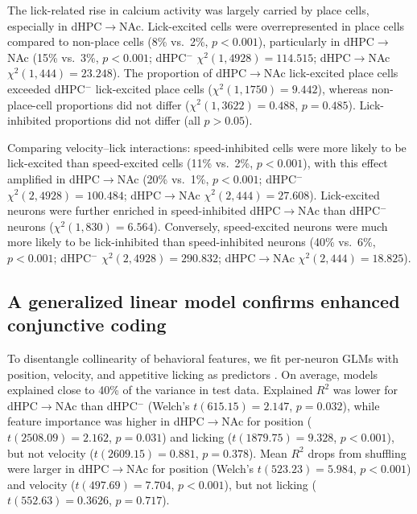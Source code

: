 \documentclass[10pt,a4paper]{article}
\begin{document}
The lick-related rise in calcium activity was largely carried by place cells, especially in dHPC$\rightarrow$NAc. Lick-excited cells were overrepresented in place cells compared to non-place cells (8\% vs.\ 2\%, $p<0.001$), particularly in dHPC$\rightarrow$NAc (15\% vs.\ 3\%, $p<0.001$; dHPC$^{-}$ $\chi^2(1,4928)=114.515$; dHPC$\rightarrow$NAc $\chi^2(1,444)=23.248$). The proportion of dHPC$\rightarrow$NAc lick-excited place cells exceeded dHPC$^{-}$ lick-excited place cells ($\chi^2(1,1750)=9.442$), whereas non-place-cell proportions did not differ ($\chi^2(1,3622)=0.488$, $p=0.485$). Lick-inhibited proportions did not differ (all $p>0.05$).

Comparing velocity--lick interactions: speed-inhibited cells were more likely to be lick-excited than speed-excited cells (11\% vs.\ 2\%, $p<0.001$), with this effect amplified in dHPC$\rightarrow$NAc (20\% vs.\ 1\%, $p<0.001$; dHPC$^{-}$ $\chi^2(2,4928)=100.484$; dHPC$\rightarrow$NAc $\chi^2(2,444)=27.608$). Lick-excited neurons were further enriched in speed-inhibited dHPC$\rightarrow$NAc than dHPC$^{-}$ neurons ($\chi^2(1,830)=6.564$). Conversely, speed-excited neurons were much more likely to be lick-inhibited than speed-inhibited neurons (40\% vs.\ 6\%, $p<0.001$; dHPC$^{-}$ $\chi^2(2,4928)=290.832$; dHPC$\rightarrow$NAc $\chi^2(2,444)=18.825$).

\subsection{A generalized linear model confirms enhanced conjunctive coding}
To disentangle collinearity of behavioral features, we fit per-neuron GLMs with position, velocity, and appetitive licking as predictors \cite{hardcastle2017multiplexed}. On average, models explained close to 40\% of the variance in test data. Explained $R^2$ was lower for dHPC$\rightarrow$NAc than dHPC$^{-}$ (Welch's $t(615.15)=2.147$, $p=0.032$), while feature importance was higher in dHPC$\rightarrow$NAc for position ($t(2508.09)=2.162$, $p=0.031$) and licking ($t(1879.75)=9.328$, $p<0.001$), but not velocity ($t(2609.15)=0.881$, $p=0.378$). Mean $R^2$ drops from shuffling were larger in dHPC$\rightarrow$NAc for position (Welch's $t(523.23)=5.984$, $p<0.001$) and velocity ($t(497.69)=7.704$, $p<0.001$), but not licking ($t(552.63)=0.3626$, $p=0.717$).
\end{document}
